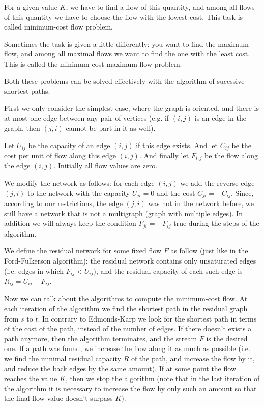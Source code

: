 \documentclass[8pt, a4paper, oneside, twocolumn]{extarticle}
\begin{document}
For a given value $K$, we have to find a flow of this quantity, and among all flows of this quantity we have to choose the flow with the lowest cost. This task is called minimum-cost flow problem.

Sometimes the task is given a little differently: you want to find the maximum flow, and among all maximal flows we want to find the one with the least cost. This is called the minimum-cost maximum-flow problem.

Both these problems can be solved effectively with the algorithm of sucessive shortest paths.

First we only consider the simplest case, where the graph is oriented, and there is at most one edge between any pair of vertices (e.g. if $(i, j)$ is an edge in the graph, then $(j, i)$ cannot be part in it as well).

Let $U_{i j}$ be the capacity of an edge $(i, j)$ if this edge exists. And let $C_{i j}$ be the cost per unit of flow along this edge $(i, j)$. And finally let $F_{i, j}$ be the flow along the edge $(i, j)$. Initially all flow values are zero.

We modify the network as follows: for each edge $(i, j)$ we add the reverse edge $(j, i)$ to the network with the capacity $U_{j i} = 0$ and the cost $C_{j i} = -C_{i j}$. Since, according to our restrictions, the edge $(j, i)$ was not in the network before, we still have a network that is not a multigraph (graph with multiple edges). In addition we will always keep the condition $F_{j i} = -F_{i j}$ true during the steps of the algorithm.

We define the residual network for some fixed flow $F$ as follow (just like in the Ford-Fulkerson algorithm): the residual network contains only unsaturated edges (i.e. edges in which $F_{i j} < U_{i j}$), and the residual capacity of each such edge is $R_{i j} = U_{i j} - F_{i j}$.

Now we can talk about the algorithms to compute the minimum-cost flow. At each iteration of the algorithm we find the shortest path in the residual graph from $s$ to $t$. In contrary to Edmonds-Karp we look for the shortest path in terms of the cost of the path, instead of the number of edges. If there doesn't exists a path anymore, then the algorithm terminates, and the stream $F$ is the desired one. If a path was found, we increase the flow along it as much as possible (i.e. we find the minimal residual capacity $R$ of the path, and increase the flow by it, and reduce the back edges by the same amount). If at some point the flow reaches the value $K$, then we stop the algorithm (note that in the last iteration of the algorithm it is necessary to increase the flow by only such an amount so that the final flow value doesn't surpass $K$).
\end{document}
